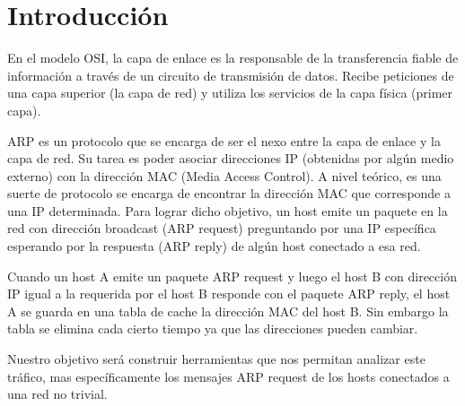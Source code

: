 \section{Introducción}

\PARstart 
En el modelo OSI, la capa de enlace es la responsable de la transferencia fiable
de información a través de un circuito de transmisión de datos. Recibe peticiones de
una capa superior (la capa de red) y utiliza los servicios de la capa física (primer
capa). 

ARP es un protocolo que se encarga de ser el nexo entre la capa de enlace y la capa de red. 
Su tarea es poder asociar direcciones IP (obtenidas por algún medio externo) con la dirección MAC (Media Access Control).
A nivel teórico, es una suerte de protocolo se encarga de encontrar la dirección MAC que corresponde a una IP determinada.
Para lograr dicho objetivo, un host emite un paquete en la red con dirección broadcast (ARP request) preguntando
por una IP específica esperando por la respuesta (ARP reply) de algún host conectado a esa red. 


Cuando un host A emite un paquete ARP request y luego el host B con dirección IP igual a la requerida por el host B
responde con el paquete ARP reply, el host A se guarda en una tabla de cache la dirección MAC del host B.
Sin embargo la tabla se elimina cada cierto tiempo ya que las direcciones pueden cambiar.

Nuestro objetivo será construir herramientas que nos permitan analizar este tráfico,
mas específicamente los mensajes ARP request de los hosts conectados a una red no trivial.
